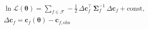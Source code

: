 \documentclass[border=2pt]{standalone}
\begin{document}
\fontsize{25}{30}\selectfont
$\begin{gathered}
  \ln\mathcal{L}(\bm{\theta}) = \sum_{f\in\mathcal{F}}
  -\tfrac{1}{2}\,\Delta\mathbf{c}_f^{\top}\,\bm{\Sigma}_f^{-1}\,
  \Delta\mathbf{c}_f + \mathrm{const}, \\[4pt]
  \Delta\mathbf{c}_f = \mathbf{c}_f(\bm{\theta}) - \mathbf{c}_{f,\mathrm{obs}}
\end{gathered}$
\end{document}
